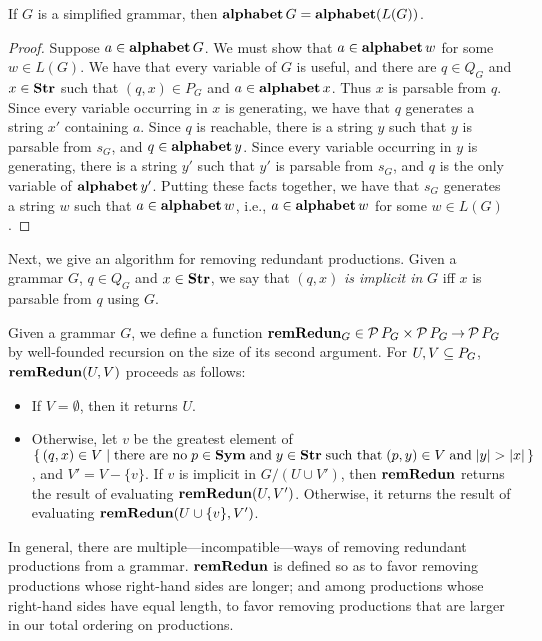 \begin{proposition}
If $G$ is a simplified grammar, then $\mathbf{alphabet}\,G = \mathbf{alphabet}(L(G))$.
\end{proposition}

\begin{proof}
Suppose $a\in\mathbf{alphabet}\,G$.  We must show that $a\in\mathbf{alphabet}\,w$ for
some $w\in L(G)$.  We have that every variable of $G$ is useful, and
there are $q\in Q_G$ and $x\in\mathbf{Str}$ such that $(q,x)\in P_G$ and
$a\in\mathbf{alphabet}\,x$.  Thus $x$ is parsable from $q$.  Since every
variable occurring in $x$ is generating, we have that $q$ generates a
string $x'$ containing $a$.  Since $q$ is reachable, there is a string
$y$ such that $y$ is parsable from $s_G$, and $q\in\mathbf{alphabet}\,y$.
Since every variable occurring in $y$ is generating, there is a string
$y'$ such that $y'$ is parsable from $s_G$, and $q$ is the only
variable of $\mathbf{alphabet}\,y'$.  Putting these facts together, we have
that $s_G$ generates a string $w$ such that $a\in\mathbf{alphabet}\,w$, i.e.,
$a\in\mathbf{alphabet}\,w$ for some $w\in L(G)$.
\end{proof}

Next, we give an algorithm for removing redundant productions.
Given a grammar $G$, $q\in Q_G$ and $x\in\mathbf{Str}$, we say that
%
$(q,x)$ \emph{is implicit in} $G$ iff $x$ is parsable from $q$ using
$G$.

Given a grammar $G$, we define a function
$\mathbf{remRedun}_G\in{\cal P} \,P_G\times{\cal P} \,P_G\mathbin{\to}{\cal P} \,P_G$ by
well-founded recursion on the size of its second argument.
For $U,V\subseteq P_G$, $\mathbf{remRedun}(U, V)$ proceeds as follows:
\begin{itemize}
\item If $V=\emptyset$, then it returns $U$.

\item Otherwise, let $v$ be the greatest element of $\{ \, (q,x)\in
    V \mid \allowbreak\mbox{there are no}\allowbreak\; p\in\mathbf{Sym} \;\allowbreak\mbox{and}\allowbreak\; y\in\mathbf{Str} \;\allowbreak\mbox{such
      that}\allowbreak\; (p,y)\in V \;\allowbreak\mbox{and}\allowbreak\; |y| > |x| \, \}$, and $V' = V - \{v\}$.
  If $v$ is implicit in $G/(U\cup V')$, then $\mathbf{remRedun}$ returns the
  result of evaluating $\mathbf{remRedun}(U, V')$.  Otherwise, it returns the
  result of evaluating $\mathbf{remRedun}(U \cup \{v\}, V')$.
\end{itemize}

In general, there are multiple---incompatible---ways of removing
redundant productions from a grammar.  $\mathbf{remRedun}$ is defined so as to
favor removing productions whose right-hand sides are longer; and
among productions whose right-hand sides have equal length, to favor
removing productions that are larger in our total ordering on
productions.

